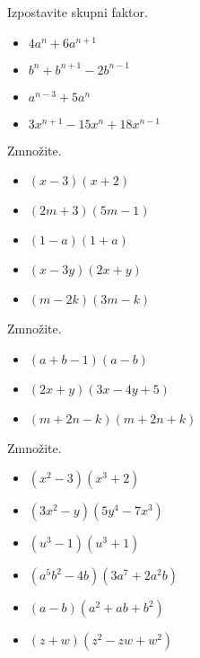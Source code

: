 \begin{multicols}{2}
    
        
            \begin{naloga}
                Izpostavite skupni faktor.
                \begin{itemize}
                    \item $4a^n+6a^{n+1}$ 
                    \item $b^n+b^{n+1}-2b^{n-1}$ 
                    \item $a^{n-3}+5a^n$ 
                    \item $3x^{n+1}-15x^n+18x^{n-1}$ 
                \end{itemize}
            \end{naloga}
        
    
        
            \begin{naloga}
                Zmnožite.
                \begin{itemize}
                    \item $(x-3)(x+2)$ 
                    \item $(2m+3)(5m-1)$ 
                    \item $(1-a)(1+a)$ 
                    \item $(x-3y)(2x+y)$ 
                    \item $(m-2k)(3m-k)$ 
                \end{itemize}
            \end{naloga}
        
    
        
            \begin{naloga}
                Zmnožite.
                \begin{itemize}
                    \item $(a+b-1)(a-b)$ 
                    \item $(2x+y)(3x-4y+5)$ 
                    \item $(m+2n-k)(m+2n+k)$ 
                \end{itemize}
            \end{naloga}
        
    
        
            \begin{naloga}
                Zmnožite.
                \begin{itemize}
                    \item $(x^2-3)(x^3+2)$ 
                    \item $(3x^2-y)(5y^4-7x^3)$ 
                    \item $(u^3-1)(u^3+1)$ 
                    \item $(a^5b^2-4b)(3a^7+2a^2b)$ 
                    \item $(a-b)(a^2+ab+b^2)$ 
                    \item $(z+w)(z^2-zw+w^2)$ 
                \end{itemize}
            \end{naloga}


\end{multicols}

